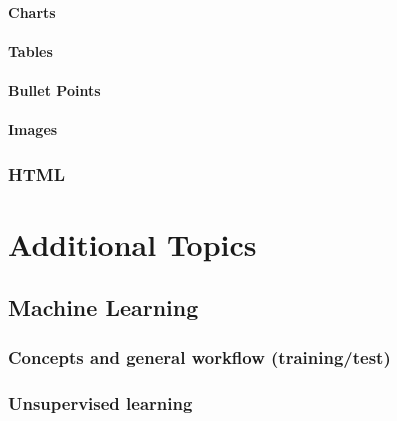 \documentclass[
]{book}
\begin{document}
\hypertarget{charts}{%
\subsection{Charts}\label{charts}}

\hypertarget{tables}{%
\subsection{Tables}\label{tables}}

\hypertarget{bullet-points}{%
\subsection{Bullet Points}\label{bullet-points}}

\hypertarget{images}{%
\subsection{Images}\label{images}}

\hypertarget{html}{%
\section{HTML}\label{html}}

\hypertarget{part-additional-topics}{%
\part*{Additional Topics}\label{part-additional-topics}}

\hypertarget{machine_learning}{%
\chapter{Machine Learning}\label{machine_learning}}

\hypertarget{concepts-and-general-workflow-trainingtest}{%
\section{Concepts and general workflow (training/test)}\label{concepts-and-general-workflow-trainingtest}}

\hypertarget{unsupervised-learning}{%
\section{Unsupervised learning}\label{unsupervised-learning}}
\end{document}
